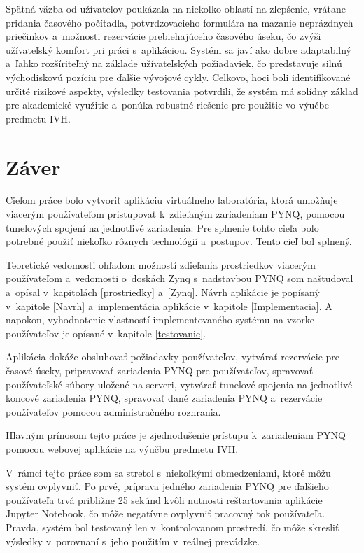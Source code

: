 Spätná väzba od užívateľov poukázala na niekoľko oblastí na zlepšenie, vrátane pridania časového počítadla, potvrdzovacieho formulára na mazanie neprázdnych priečinkov a~možnosti rezervácie prebiehajúceho časového úseku, čo zvýši užívateľský komfort pri práci s~aplikáciou. Systém sa javí ako dobre adaptabilný a~ľahko rozšíriteľný na základe užívateľských požiadaviek, čo predstavuje silnú východiskovú pozíciu pre ďalšie vývojové cykly. Celkovo, hoci boli identifikované určité rizikové aspekty, výsledky testovania potvrdili, že systém má solídny základ pre akademické využitie a~ponúka robustné riešenie pre použitie vo výučbe predmetu IVH.

\chapter{Záver}

Cieľom práce bolo vytvoriť aplikáciu virtuálneho laboratória, ktorá umožňuje viacerým používateľom pristupovať k~zdieľaným zariadeniam PYNQ, pomocou tunelových spojení na jednotlivé zariadenia. Pre splnenie tohto cieľa bolo potrebné použiť niekoľko rôznych technológií a~postupov. Tento cieľ bol splnený.

Teoretické vedomosti ohľadom možností zdieľania prostriedkov viacerým používateľom a~vedomosti o~doskách Zynq s~nadstavbou PYNQ som naštudoval a~opísal v~kapitolách \ref{prostriedky} a~\ref{Zynq}. Návrh aplikácie je popísaný v~kapitole \ref{Navrh} a~implementácia aplikácie v~kapitole \ref{Implementacia}. A napokon, vyhodnotenie vlastností implementovaného systému na vzorke používateľov je opísané v~kapitole \ref{testovanie}.

Aplikácia dokáže obsluhovať požiadavky používateľov, vytvárať rezervácie pre časové úseky, pripravovať zariadenia PYNQ pre používateľov, spravovať používateľské súbory uložené na serveri, vytvárať tunelové spojenia na jednotlivé koncové zariadenia PYNQ, spravovať dané zariadenia PYNQ a~rezervácie používateľov pomocou administračného rozhrania.

Hlavným prínosom tejto práce je zjednodušenie prístupu k~zariadeniam PYNQ pomocou webovej aplikácie na výučbu predmetu IVH. 

V~rámci tejto práce som sa stretol s~niekoľkými obmedzeniami, ktoré môžu systém ovplyvniť. Po prvé, príprava jedného zariadenia PYNQ pre ďalšieho používateľa trvá približne 25 sekúnd kvôli nutnosti reštartovania aplikácie Jupyter Notebook, čo môže negatívne ovplyvniť pracovný tok používateľa. Pravda, systém bol testovaný len v~kontrolovanom prostredí, čo môže skresliť výsledky v~porovnaní s~jeho použitím v~reálnej prevádzke.  

